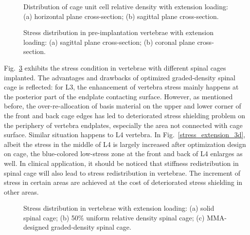 \documentclass[12pt]{extbook}
\begin{document}
\begin{figure}[htbp]
\centering
{}
\caption{Distribution of cage unit cell relative density with extension loading: (a) horizontal plane cross-section; (b) sagittal plane cross-section.}
\label{density_extension}
\end{figure}

\begin{figure}[htbp]
\centering
{}
\caption{Stress distribution in pre-implantation vertebrae with extension loading: (a) sagittal plane cross-section; (b) coronal plane cross-section.}
\label{ref_extension}
\end{figure}

Fig.~\ref{stress_extension} exhibits the stress condition in vertebrae with different spinal cages implanted. The advantages and drawbacks of optimized graded-density spinal cage is reflected: for L3, the enhancement of vertebra stress mainly happens at the posterior part of the endplate contacting surface. However, as mentioned before, the over-re-allocation of basis material on the upper and lower corner of the front and back cage edges has led to deteriorated stress shielding problem on the periphery of vertebra endplates, especially the area not connected with cage surface. Similar situation happens to L4 vertebra. In Fig.~\ref{stress_extension_3d}, albeit the stress in the middle of L4 is largely increased after optimization design on cage, the blue-colored low-stress zone at the front and back of L4 enlarges as well. In clinical application, it should be noticed that stiffness redistribution in spinal cage will also lead to stress redistribution in vertebrae. The increment of stress in certain areas are achieved at the cost of deteriorated stress shielding in other areas.\\

\begin{figure}[htbp]
\centering
{}
\caption{Stress distribution in vertebrae with extension loading: (a) solid spinal cage; (b) 50\% uniform relative density spinal cage; (c) MMA-designed graded-density spinal cage.}
\label{stress_extension}
\end{figure}
\end{document}
